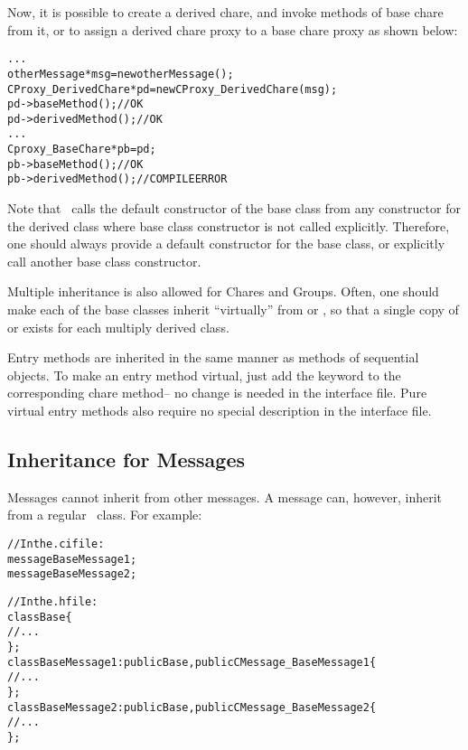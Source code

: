 Now, it is possible to create a derived chare, and invoke methods of base
chare from it, or to assign a derived chare proxy to a base chare proxy
as shown below:

\begin{alltt}
  ...
  otherMessage *msg = new otherMessage();
  CProxy_DerivedChare *pd = new CProxy_DerivedChare(msg);
  pd->baseMethod();     // OK
  pd->derivedMethod();  // OK
  ...
  Cproxy_BaseChare *pb = pd;
  pb->baseMethod();    // OK
  pb->derivedMethod(); // COMPILE ERROR
\end{alltt}

Note that \CC\ calls the default constructor  of the
base class from any constructor for the derived class where base class
constructor is not called explicitly. Therefore, one should always provide a
default constructor for the base class, or explicitly call another base
class constructor.

Multiple inheritance  is also allowed for Chares
and Groups. Often, one should make each of the base classes inherit
``virtually'' from  or , so that a single copy of
 or  exists for each multiply derived class.

Entry methods are inherited in the
same manner as methods of sequential \CC{} objects.  
To make an entry method virtual, just add the keyword 
to the corresponding chare method-- no change is needed in the interface file.
Pure virtual entry methods also require no special description
in the interface file.


\subsection{Inheritance for Messages}


Messages cannot inherit from other messages.  A message can, however,
inherit from a regular \CC\ class.  For example:

\begin{alltt}
//In the .ci file:
  message BaseMessage1;
  message BaseMessage2;

//In the .h file:
  class Base \{
    // ...
  \};
  class BaseMessage1 : public Base, public CMessage_BaseMessage1 \{
    // ...
  \};
  class BaseMessage2 : public Base, public CMessage_BaseMessage2 \{
    // ...
  \};
\end{alltt}

